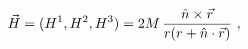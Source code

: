 \begin{equation}
{\vec{H}}=(H^{1},H^{2},H^{3})=2M\,\frac{{\hat{n}}\times {\vec{r}}}{r(r+{\hat{%
n}}\cdot {\vec{r}})}\ ,  \label{gala}
\end{equation}%
